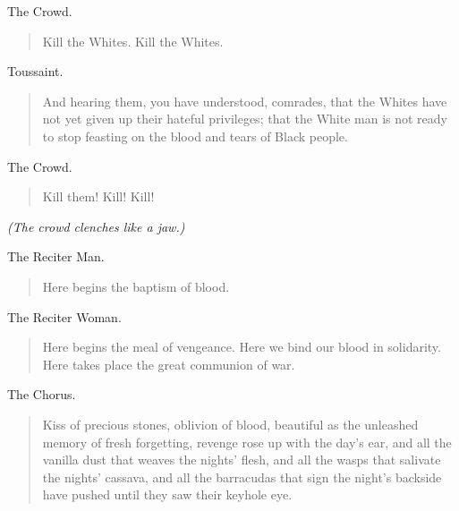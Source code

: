 \documentclass[letterpaper,article,12pt,oneside,notitlepage]{memoir}
\begin{document}
\begin{center}The Crowd.\end{center}

\begin{verse}
\hspace{1cm} Kill the Whites. Kill the Whites. \\
\end{verse}

\begin{center}Toussaint.\end{center}

\begin{verse}
\indent And hearing them, you have understood, comrades, that the Whites have not yet given up their hateful privileges; that the White man is not ready to stop feasting on the blood and tears of Black people. \\
\end{verse}

\begin{center}The Crowd.\end{center}

\begin{verse}
\hspace{1cm} Kill them! Kill! Kill! \\
\end{verse}

\textit{(The crowd clenches like a jaw.)}

\begin{center}The Reciter Man.\end{center}

\begin{verse}
\hspace{1cm} Here begins the baptism of blood. \\
\end{verse}

\begin{center}The Reciter Woman.\end{center}

\begin{verse}
\indent Here begins the meal of vengeance. Here we bind our blood in solidarity. Here takes place the great communion of war. \\
\end{verse}

\begin{center}The Chorus.\end{center}

\begin{verse}
Kiss of precious stones, oblivion of blood, beautiful as the unleashed memory of fresh forgetting, revenge rose up with the day's ear, and all the vanilla dust that weaves the nights' flesh, and all the wasps that salivate the nights' cassava, and all the barracudas that sign the night's backside have pushed until they saw their keyhole eye. \\
\end{verse}
\end{document}
